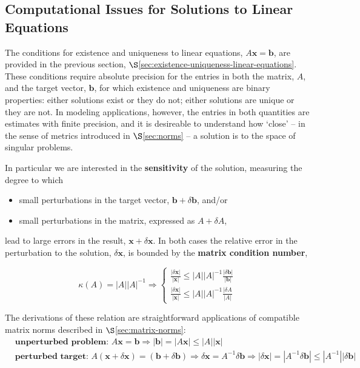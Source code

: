 \documentclass[12pt, twoside, draft]{article}
\begin{document}
\subsection{Computational Issues for Solutions to Linear Equations}\label{sec:computational-issues-linear-equations}
The conditions for existence and uniqueness to linear equations, $A\mathbf{x}=\mathbf{b}$, are provided in the previous section, $\S$\ref{sec:existence-uniqueness-linear-equations}.  These conditions require absolute precision for the entries in both the matrix, $A$, and the target vector, $\mathbf{b}$, for which existence and uniqueness are binary properties: either solutions exist or they do not; either solutions are unique or they are not.  In modeling applications, however, the entries in both quantities are estimates with finite precision, and it is desireable to understand how `close' -- in the sense of metrics introduced in $\S$\ref{sec:norms} -- a solution is to the space of singular problems.

In particular we are interested in the \textbf{sensitivity} of the solution, measuring the degree to which
\begin{itemize}[noitemsep]
\item small perturbations in the target vector, $\mathbf{b} + \delta \mathbf{b}$, and/or
\item small perturbations in the matrix, expressed as $A + \delta A$,
\end{itemize}
 lead to large errors in the result, $\mathbf{x} + \delta \mathbf{x}$.  In both cases the relative error in the perturbation to the solution, $\delta \mathbf{x}$, is bounded by the \textbf{matrix condition number},

\begin{equation}\label{eq:matrix_condition_number}
\kappa(A) = |A| |A|^{-1} \Rightarrow 
\begin{cases}
\frac{|\delta \mathbf{x}|}{|\mathbf{x}|} \leq |A| |A|^{-1}  \frac{|\delta \mathbf{b}|}{|\mathbf{b}|} \\
\frac{|\delta \mathbf{x}|}{|\mathbf{x}|} \leq |A| |A|^{-1}  \frac{|\delta A}{|A|}
\end{cases}
\end{equation}

The derivations of these relation are straightforward applications of compatible matrix norms described in $\S$\ref{sec:matrix-norms}:
\begin{align}\label{eq:target_vector_norms}
&\textbf{unperturbed problem: } A \mathbf{x} = \mathbf{b} \Rightarrow |\mathbf{b}| = |A \mathbf{x}| \leq |A| |\mathbf{x}| \\
\label{eq:perturbed_target}
&\textbf{perturbed target: } A \left( \mathbf{x} + \delta \mathbf{x} \right) = \left( \mathbf{b} + \delta \mathbf{b} \right) \Rightarrow \delta \mathbf{x} = A^{-1} \delta \mathbf{b} \Rightarrow |\delta \mathbf{x} | = |A^{-1} \delta \mathbf{b}| \leq |A^{-1}||\delta \mathbf{b}|
\end{align}
\end{document}
